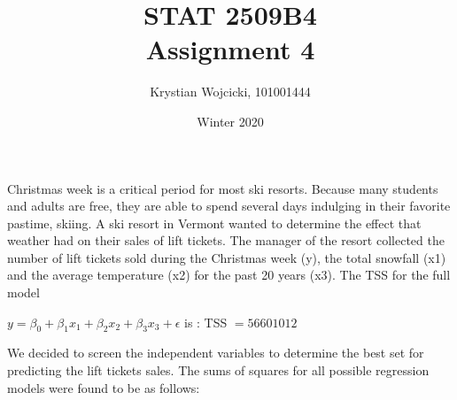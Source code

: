 \documentclass{article}
\title{STAT 2509B4 \\
	\large{Assignment 4}}
\author{Krystian Wojcicki, 101001444}
\date{Winter 2020}
\begin{document}
\maketitle


Christmas week is a critical period for most ski resorts. Because many students and
adults are free, they are able to spend several days indulging in their favorite pastime,
skiing. A ski resort in Vermont wanted to determine the effect that weather had on their
sales of lift tickets. The manager of the resort collected the number of lift tickets sold
during the Christmas week (y), the total snowfall (x1) and the average temperature (x2)
for the past 20 years (x3). The TSS for the full model

$y = \beta_0 + \beta_1x_1 + \beta_2x_2 + \beta_3 x_3 + \epsilon$ is : TSS $= 56 601 012$

We decided to screen the independent variables to determine the best set for predicting the lift
tickets sales. The sums of squares for all possible regression models were found to be as
follows: 
\end{document}
